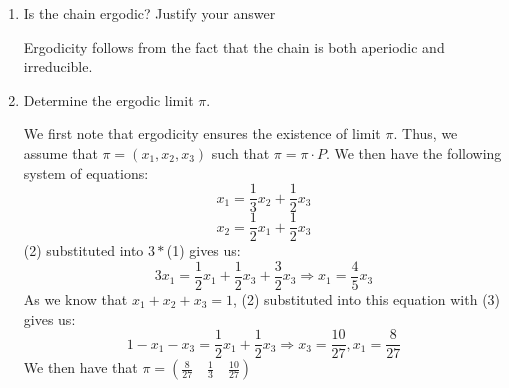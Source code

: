 \documentclass[12pt,twoside, letter]{exam}
\theoremstyle{definition}
\begin{document}
\begin{enumerate}
  \item Is the chain ergodic? Justify your answer
    \begin{solution}
      Ergodicity follows from the fact that the chain is both aperiodic and irreducible.
    \end{solution}
  \item Determine the ergodic limit $\pi$.
    \begin{solution}
      We first note that ergodicity ensures the existence of limit $\pi$. Thus, we assume that $\pi = (x_1, x_2, x_3)$ such that
      $\pi = \pi \cdot P$. We then have the following system of equations:
        \begin{equation}
          x_1 = \frac{1}{3} x_2 + \frac{1}{2} x_3
        \end{equation}
        \begin{equation}
          x_2 = \frac{1}{2} x_1 + \frac{1}{2} x_{3}
        \end{equation}
          (2) substituted into $3*$(1) gives us:
        \begin{equation}
          3x_1 = \frac{1}{2}x_1 + \frac{1}{2}x_3 + \frac{3}{2}x_3 \Rightarrow x_1 = \frac{4}{5}x_3
        \end{equation}
      As we know that $x_1 + x_2 + x_3 = 1$, (2) substituted into this equation with (3) gives us:
        \begin{equation}
          1-x_1 - x_3 = \frac{1}{2}x_1 + \frac{1}{2}x_{3} \Rightarrow x_3 = \frac{10}{27}, x_{1} = \frac{8}{27}
        \end{equation}
      We then have that $\pi = (\frac{8}{27} \quad \frac{1}{3} \quad \frac{10}{27})$
    \end{solution}
\end{enumerate}
\end{document}
